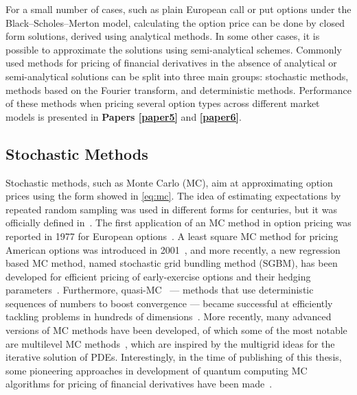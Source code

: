 \documentclass{UUThesisTemplate}
\begin{document}
\par
For a small number of cases, such as plain European call or put options under the Black--Scholes--Merton model, calculating the option price can be done by closed form solutions, derived using analytical methods. In some other cases, it is possible to approximate the solutions using semi-analytical schemes. Commonly used methods for pricing of financial derivatives in the absence of analytical or semi-analytical solutions can be split into three main groups: stochastic methods, methods based on the Fourier transform, and deterministic methods. Performance of these methods when pricing several option types across different market models is presented in \textbf{Papers \ref{paper5}} and \textbf{\ref{paper6}}.%



%



%
\subsection{Stochastic Methods}

\par
Stochastic methods, such as Monte Carlo (MC), aim at approximating option prices using the form showed in \eqref{eq:mc}. The idea of estimating expectations by repeated random sampling was used in different forms for centuries, but it was officially defined in~\cite{metropolis1949monte}. The first application of an MC method in option pricing was reported in 1977 for European options~\cite{boyle1977options}. A least square MC method for pricing American options was introduced in 2001~\cite{longstaff2001valuing}, and more recently, a new regression based MC method, named stochastic grid bundling method (SGBM), has been developed for efficient pricing of early-exercise options and their hedging parameters~\cite{jain2015stochastic}. Furthermore, quasi-MC~\cite{paskov1995faster} --- methods that use deterministic sequences of numbers to boost convergence --- became successful at efficiently tackling problems in hundreds of dimensions~\cite{dick2013high}. More recently, many advanced versions of MC methods have been developed, of which some of the most notable are multilevel MC methods~\cite{giles2008multilevel}, which are inspired by the multigrid ideas for the iterative solution of PDEs. %
Interestingly, in the time of publishing of this thesis, some pioneering approaches in development of quantum computing MC algorithms for pricing of financial derivatives have been made~\cite{rebentrost2018quantum}.
\end{document}
